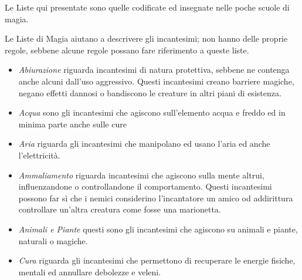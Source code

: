 \begin{multicols}{2}
Le Liste qui presentate sono quelle codificate ed insegnate nelle poche scuole di magia.


Le Liste di Magia aiutano a descrivere gli incantesimi; non hanno delle proprie regole, sebbene alcune regole possano fare riferimento a queste liste.

\begin{itemize}[leftmargin=*] \setlength{\itemsep}{0pt}
\item
\emph{Abiurazione} riguarda incantesimi di natura protettiva, sebbene ne contenga anche alcuni dall'uso aggressivo. Questi incantesimi creano barriere magiche, negano effetti dannosi o bandiscono le creature in altri piani di esistenza.

\item
\emph{Acqua} sono gli incantesimi che agiscono sull'elemento acqua e freddo ed in minima parte anche sulle cure

\item
\emph{Aria} riguarda gli incantesimi che manipolano ed usano l'aria ed anche l'elettricità.

\item
\emph{Ammaliamento} riguarda incantesimi che agiscono sulla mente altrui, influenzandone o controllandone il comportamento. Questi incantesimi possono far sì che i nemici considerino l'incantatore un amico od addirittura controllare un'altra creatura come fosse una marionetta.

\item
\emph{Animali e Piante} questi sono gli incantesimi che agiscono su animali e piante, naturali o magiche.

\item
\emph{Cura} riguarda gli incantesimi che permettono di recuperare le energie fisiche, mentali ed annullare debolezze e veleni.


\end{itemize}
\end{multicols}
